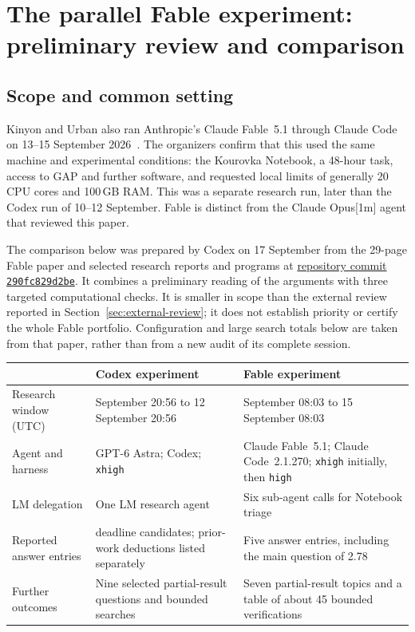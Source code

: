 \clearpage
\section{The parallel Fable experiment: preliminary review and comparison}
\label{app:parallel-fable}

\subsection{Scope and common setting}

Kinyon and Urban also ran Anthropic's Claude Fable~5.1 through Claude
Code on 13--15 September 2026~\cite{fable-kourovka}. The organizers
confirm that this used the same machine and experimental conditions:
the Kourovka Notebook, a 48-hour task, access to GAP and further software,
and requested local limits of generally 20 CPU cores and 100\,GB RAM.
This was a separate research run, later than the Codex run of
10--12 September. Fable is distinct from the Claude Opus[1m] agent that
reviewed this paper.

The comparison below was prepared by Codex on 17 September from the
29-page Fable paper and selected research reports and programs at
\href{https://github.com/JUrban/kour1cl/tree/290fc829d2be01cab8a1784d006bfc0250d7f11c}{repository commit \texttt{290fc829d2be}}.
It combines a preliminary reading of the arguments with three targeted
computational checks. It is smaller in scope than the external review
reported in Section~\ref{sec:external-review}; it does not establish
priority or certify the whole Fable portfolio. Configuration and large
search totals below are taken from that paper, rather than from a new
audit of its complete session.

\begin{center}\small
\begin{tabular}{@{}>{\raggedright\arraybackslash}p{}>{\raggedright\arraybackslash}p{}>{\raggedright\arraybackslash}p{}@{}}
\toprule
 & Codex experiment & Fable experiment\\\midrule
Research window (UTC) & 10 September 20:56 to 12 September 20:56 & 13 September 08:03 to 15 September 08:03\\[3pt]
Agent and harness & GPT-6 Astra; Codex; \texttt{xhigh} & Claude Fable~5.1; Claude Code~2.1.270; \texttt{xhigh} initially, then \texttt{high}\\[3pt]
LM delegation & One LM research agent & Six sub-agent calls for Notebook triage\\[3pt]
Reported answer entries & 46 deadline candidates; prior-work deductions listed separately & Five answer entries, including the main question of 2.78\\[3pt]
Further outcomes & Nine selected partial-result questions and bounded searches & Seven partial-result topics and a table of about 45 bounded verifications\\
\bottomrule
\end{tabular}
\end{center}

